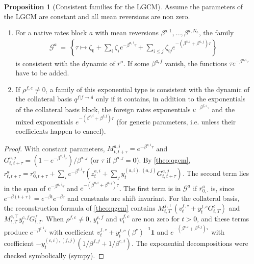 \documentclass[11pt,english]{amsart}
\newcommand{\vun}{\mathbf{1}}
\theoremstyle{definition}
\newtheorem{prop}{Proposition}
\begin{document}
\begin{prop}[Consistent families for the LGCM]\label{prop:consistent_families}
Assume the parameters of the LGCM are constant and all mean reversions are non zero.
\begin{enumerate}
\item For a native rates block $a$ with mean reversions $\beta^{a,1},\ldots,\beta^{a,N_a}$, the family
\begin{eqnarray*}
  \mathcal{G}^a ~=~ \left\{ \tau\mapsto \zeta_0 + \sum_{i}\zeta_i e^{-\beta^{a,i}\tau} + \sum_{i\le j}\zeta_{ij}e^{-(\beta^{a,i}+\beta^{a,j})\tau} \right\}
\end{eqnarray*}
is consistent with the dynamic of $r^{a}$. If some $\beta^{a,j}$ vanish, the functions $\tau e^{-\beta^{a,i}\tau}$ have to be added.
\item If $\rho^{f,c}\neq 0$, a family of this exponential type is consistent with the dynamic of the collateral basis $q^{f|f\to d}$ only if it contains, in addition to the exponentials of the collateral basis block, the foreign rates exponentials $e^{-\beta^{f,i}\tau}$ and the mixed exponentials $e^{-(\beta^{c,i}+\beta^{f,j})\tau}$ (for generic parameters, i.e. unless their coefficients happen to cancel).
\end{enumerate}
\end{prop}

\begin{proof}
With constant parameters, $M^{a,i}_{t,t+\tau} = e^{-\beta^{a,i}\tau}$ and $G^{a,j}_{t,t+\tau} = (1-e^{-\beta^{a,j}\tau})/\beta^{a,j}$ (or $\tau$ if $\beta^{a,j}=0$). By \autoref{theo:qgcm}, $r^a_{t,t+\tau} = r^a_{0,t+\tau} + \sum_i e^{-\beta^{a,i}\tau}(z^{a,i}_t + \sum_j y^{(a,i),(a,j)}_tG^{a,j}_{t,t+\tau})$. The second term lies in the span of $e^{-\beta^{a,i}\tau}$ and $e^{-(\beta^{a,i}+\beta^{a,j})\tau}$. The first term is in $\mathcal{G}^a$ if $r^a_{0,\cdot}$ is, since $e^{-\beta(t+\tau)} = e^{-\beta t}e^{-\beta\tau}$ and constants are shift invariant. For the collateral basis, the reconstruction formula of \autoref{theo:qgcm} contains $M^{f,\top}_{t,T}(v^{f,c}_t + y^{f,c}_tG^c_{t,T})$ and $M^{c,\top}_{t,T}y^{c,f}_tG^f_{t,T}$. When $\rho^{f,c}\neq 0$, $y^{c,f}_t$ and $v^{f,c}_t$ are non zero for $t>0$, and these terms produce $e^{-\beta^{f,i}\tau}$ with coefficient $v^{f,c}_t + y^{f,c}_t(\beta^c)^{-1}\vun$ and $e^{-(\beta^{c,i}+\beta^{f,j})\tau}$ with coefficient $-y^{(c,i),(f,j)}_t\left(1/\beta^{f,j} + 1/\beta^{c,i}\right)$. The exponential decompositions were checked symbolically (sympy).
\end{proof}
\end{document}
